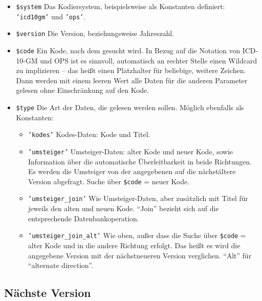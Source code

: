 \begin{itemize}
\item \texttt{\$system} \newline Das Kodiersystem, beispielsweise als Konstanten definiert: \texttt{'icd10gm'} und \texttt{'ops'}. 
\item \texttt{\$version} \newline Die Version, beziehungsweise Jahreszahl.
\item \texttt{\$code} \newline Ein Kode, nach dem gesucht wird. In Bezug auf die Notation von ICD-10-GM und OPS ist es sinnvoll, automatisch an rechter Stelle einen Wildcard zu implizieren -- das heißt einen Platzhalter für beliebige, weitere Zeichen. Dann werden mit einem leeren Wert alle Daten für die anderen Parameter gelesen ohne Einschränkung auf den Kode. 
\item \texttt{\$type} \newline Die Art der Daten, die gelesen werden sollen. Möglich ebenfalls als Konstanten:
  \begin{itemize}
  \item \texttt{'kodes'} \newline Kodes-Daten: Kode und Titel. 
  \item \texttt{'umsteiger'} \newline Umsteiger-Daten: alter Kode und neuer Kode, sowie Information über die automatische Überleitbarkeit in beide Richtungen. Es werden die Umsteiger von der angegebenen auf die nächstältere Version abgefragt. Suche über \texttt{\$code} = neuer Kode. 
  \item \texttt{'umsteiger\_join'} \newline Wie Umsteiger-Daten, aber zusätzlich mit Titel für jeweils den alten und neuen Kode. "`Join"' bezieht sich auf die entsprechende Datenbankoperation.
  \item \texttt{'umsteiger\_join\_alt'} \newline Wie oben, außer dass die Suche über \texttt{\$code} = alter Kode und in die andere Richtung erfolgt. Das heißt es wird die angegebene Version mit der nächstneueren Version verglichen. "`Alt"' für "`alternate direction"'. \\
  \end{itemize}
\end{itemize}

\subsection{Nächste Version}


